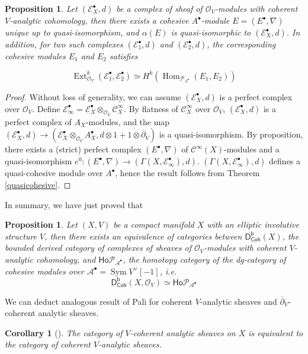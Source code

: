 \documentclass[12pt]{amsart}
\newtheorem{cor}[thm]{Corollary}
\newtheorem{prop}[thm]{Proposition}
\theoremstyle{definition}
\theoremstyle{remark}
\numberwithin{equation}{section}
\newcommand{\del}{\partial}
\renewcommand{\del}{\partial}
\newcommand{\CA}{{\mathcal A}}
\newcommand{\CO}{{\mathcal O}}
\newcommand{\cinf}{{\mathcal C}^{\infty}}
\newcommand{\1}{{\mathbb{1}}}
\newcommand{\ho}{\mathsf{Ho}}
\newcommand{\dcoh}{\mathsf{D^b_{Coh}}}
\newcommand{\Hom}{\operatorname{Hom}}
\newcommand{\ext}{\operatorname{Ext}}
\newcommand{\sym}{\operatorname{Sym}}
\begin{document}
\begin{prop}
Let $(\mathcal{E}^{\bullet}_X, d)$ be a complex of sheaf of $\CO_V$-modules with coherent $V$-analytic cohomology, then there exists a cohesive $A^{\bullet}$-module $E = (E^{\bullet}, \nabla)$unique up to quasi-isomorphism, and $\alpha(E)$ is  quasi-isomorphic to $(\mathcal{E}^{\bullet}_X, d)$. In addition, for two such complexes $(\mathcal{E}^{\bullet}_1, d)$ and $(\mathcal{E}^{\bullet}_2, d)$, the corresponding cohesive modules $E_1$ and $E_2$ satisfies

\begin{equation}
    \ext_{\CO_V}^k(\mathcal{E}^{\bullet}_1, \mathcal{E}^{\bullet}_2) \simeq H^k(\Hom_{\mathcal{P}_{A^{\bullet}}}(E_1, E_2))
\end{equation}
\end{prop}
\begin{proof}
 Without loss of generality, we can assume $(\mathcal{E}^{\bullet}_X, d)$ is a perfect complex over $\CO_V$. Define $\mathcal{E}^{\bullet}_{\infty} =\mathcal{E}^{\bullet}_X\otimes_{\CO_V}\cinf_X$. By flatness of $\cinf_X$ over $\CO_V$, $(\mathcal{E}^{\bullet}_X, d)$ is a perfect complex of $A_X$-modules, and the map $(\mathcal{E}^{\bullet}_X, d)\to (\mathcal{E}^{\bullet}_X\otimes_{\CO_V}A_X^{\bullet}, d\otimes 1 + 1\otimes \overline{\del}_V)$ is a quasi-isomorphism. By proposition, there exists a (strict) perfect complex $(E^{\bullet}, \nabla)$ of $\cinf(X)$-modules and a quasi-isomorphism $e^0:(E^{\bullet}, \nabla) \to (\Gamma(X, \mathcal{E}^{\bullet}_{\infty}), d)$. $(\Gamma(X, \mathcal{E}^{\bullet}_{\infty}), d)$ defines a quasi-cohesive module over $A^{\bullet}$, hence the result follows from Theorem \ref{quasicohesive}.
\end{proof}
In summary, we have just proved that


\begin{prop}
Let $(X, V)$ be a compact manifold $X$ with an elliptic involutive structure $V$, then there exists an equivalence of categories between $\dcoh(X)$, the bounded derived category of
complexes of sheaves of $\CO_V$-modules with coherent $V$-analytic cohomology, and $\ho \mathcal{P}_{\CA^{\bullet}}$, the homotopy category of the dg-category of cohesive modules over $\CA^{\bullet} = \sym V^{\vee}[-1]$, i.e.   
\begin{equation*}
    \dcoh(X, \CO_V) \simeq \ho \mathcal{P}_{\CA^{\bullet}}
\end{equation*}
\end{prop}

We can deduct analogous result of Pali for coherent $V$-analytic sheaves and $\overline{\del}_V$-coherent analytic sheaves. 
\begin{cor}[] The category of $V$-coherent analytic sheaves on $X$ is equivalent to the category of coherent $V$-analytic sheaves.
    
\end{cor}
\end{document}
